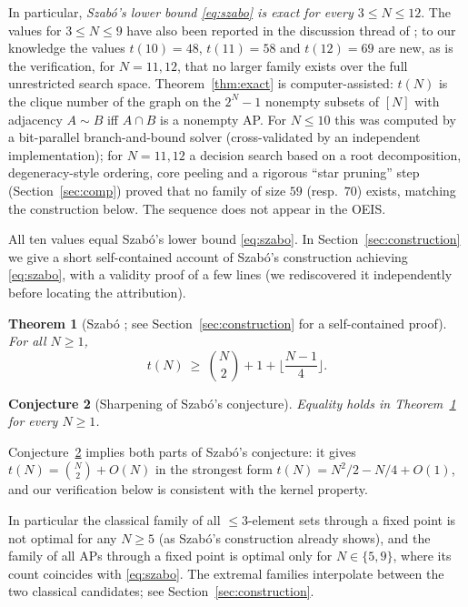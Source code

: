 \documentclass[11pt]{article}
\newtheorem{theorem}{Theorem}[section]
\newtheorem{conjecture}[theorem]{Conjecture}
\theoremstyle{definition}
\begin{document}
In particular, \emph{Szab\'o's lower bound \eqref{eq:szabo} is exact for every $3\le N\le 12$}. The values for $3\le N\le 9$ have also been reported in the discussion thread of \cite{EP272}; to our knowledge the values $t(10)=48$, $t(11)=58$ and $t(12)=69$ are new, as is the verification, for $N=11,12$, that no larger family exists over the full unrestricted search space. Theorem~\ref{thm:exact} is computer-assisted: $t(N)$ is the clique number of the graph on the $2^N-1$ nonempty subsets of $[N]$ with adjacency $A\sim B$ iff $A\cap B$ is a nonempty AP. For $N\le 10$ this was computed by a bit-parallel branch-and-bound solver (cross-validated by an independent implementation); for $N=11,12$ a decision search based on a root decomposition, degeneracy-style ordering, core peeling and a rigorous ``star pruning'' step (Section~\ref{sec:comp}) proved that no family of size $59$ (resp.\ $70$) exists, matching the construction below. The sequence does not appear in the OEIS.

All ten values equal Szab\'o's lower bound \eqref{eq:szabo}. In Section~\ref{sec:construction} we give a short self-contained account of Szab\'o's construction achieving \eqref{eq:szabo}, with a validity proof of a few lines (we rediscovered it independently before locating the attribution).

\begin{theorem}[Szab\'o \cite{Sz99}; see Section~\ref{sec:construction} for a self-contained proof]\label{thm:lower}
For all $N\ge 1$,
\[ t(N)\ \ge\ \binom{N}{2}+1+\Big\lfloor \frac{N-1}{4}\Big\rfloor. \]
\end{theorem}

\begin{conjecture}[Sharpening of Szab\'o's conjecture]\label{conj:main}
Equality holds in Theorem~\ref{thm:lower} for every $N\ge 1$.
\end{conjecture}

Conjecture~\ref{conj:main} implies both parts of Szab\'o's conjecture: it gives $t(N)=\binom N2+O(N)$ in the strongest form $t(N)=N^2/2-N/4+O(1)$, and our verification below is consistent with the kernel property.

In particular the classical family of all $\le 3$-element sets through a fixed point is not optimal for any $N\ge 5$ (as Szab\'o's construction already shows), and the family of all APs through a fixed point is optimal only for $N\in\{5,9\}$, where its count coincides with \eqref{eq:szabo}. The extremal families interpolate between the two classical candidates; see Section~\ref{sec:construction}.
\end{document}
